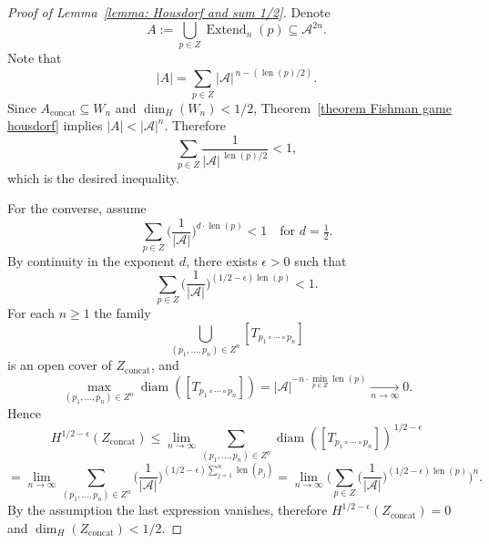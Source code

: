 \documentclass[10pt,a4paper]{amsart}
\begin{document}
\begin{proof}[Proof of Lemma~\ref{lemma: Housdorf and sum 1/2}]
\medskip

Denote
\[
A:=\bigcup_{p\in Z}\operatorname{Extend}_n(p)\subseteq\mathcal A^{2n}.
\]
Note that
\[
|A|=\sum_{p\in Z} |\mathcal A|^{\,n-(\operatorname{len}(p)/2)}.
\]
Since \(A_{\mathrm{concat}}\subseteq W_n \) and \(\dim_H(W_n)<1/2\), Theorem~\ref{theorem Fishman game housdorf} implies \(|A|<|\mathcal A|^n\). Therefore
\[
\sum_{p\in Z} \frac{1}{|\mathcal A|^{\,\operatorname{len}(p)/2}}<1,
\]
which is the desired inequality.

\medskip

For the converse, assume
\[
\sum_{p\in Z}\biggl(\frac{1}{|\mathcal A|}\biggr)^{d\cdot\operatorname{len}(p)}<1
\quad\text{for }d=\tfrac12.
\]
By continuity in the exponent \(d\), there exists \(\epsilon>0\) such that
\[
\sum_{p\in Z}\biggl(\frac{1}{|\mathcal A|}\biggr)^{(1/2-\epsilon)\operatorname{len}(p)}<1.
\]
For each \(n\ge 1\) the family
\[
\bigcup_{(p_1,\dots,p_n)\in Z^n} [T_{p_1\circ\cdots\circ p_n}]
\]
is an open cover of \(Z_{\mathrm{concat}}\), and
\[
\max_{(p_1,\dots,p_n)\in Z^n}\operatorname{diam}([T_{p_1\circ\cdots\circ p_n}])
=|\mathcal A|^{-n\cdot \min_{p\in Z}\operatorname{len}(p)} \underset{n \to \infty}{\to}0.
\]
Hence
\[
H^{1/2-\epsilon}(Z_{\mathrm{concat}})
\le
\lim_{n\to\infty}
\sum_{(p_1,\dots,p_n)\in Z^n}
\operatorname{diam}([T_{p_1\circ\cdots\circ p_n}])^{\,1/2-\epsilon}
\]
\[
=
\lim_{n\to\infty}
\sum_{(p_1,\dots,p_n)\in Z^n}
\biggl(\frac{1}{|\mathcal A|}\biggr)^{(1/2-\epsilon)\sum_{j=1}^n\operatorname{len}(p_j)}
=
\lim_{n\to\infty}
\Biggl(
\sum_{p\in Z}\biggl(\frac{1}{|\mathcal A|}\biggr)^{(1/2-\epsilon)\operatorname{len}(p)}
\Biggr)^{\!n}.
\]
By the assumption the last expression vanishes, therefore \(H^{1/2-\epsilon}(Z_{\mathrm{concat}})=0\) and \(\dim_H(Z_{\mathrm{concat}})<1/2\).
\end{proof}
\end{document}
